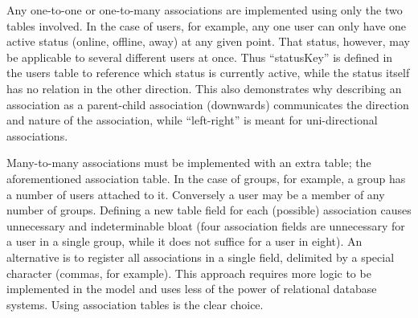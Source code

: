 Any one-to-one or one-to-many associations are implemented using only the two tables involved. In the case of users, for example, any one user can only have one active status (online, offline, away) at any given point. That status, however, may be applicable to several different users at once. Thus ``statusKey'' is defined in the users table to reference which status is currently active, while the status itself has no relation in the other direction. This also demonstrates why describing an association as a parent-child association (downwards) communicates the direction and nature of the association, while ``left-right'' is meant for uni-directional associations.

Many-to-many associations must be implemented with an extra table; the aforementioned association table. In the case of groups, for example, a group has a number of users attached to it. Conversely a user may be a member of any number of groups. Defining a new table field for each (possible) association causes unnecessary and indeterminable bloat (four association fields are unnecessary for a user in a single group, while it does not suffice for a user in eight). An alternative is to register all associations in a single field, delimited by a special character (commas, for example). This approach requires more logic to be implemented in the model and uses less of the power of relational database systems. Using association tables is the clear choice.